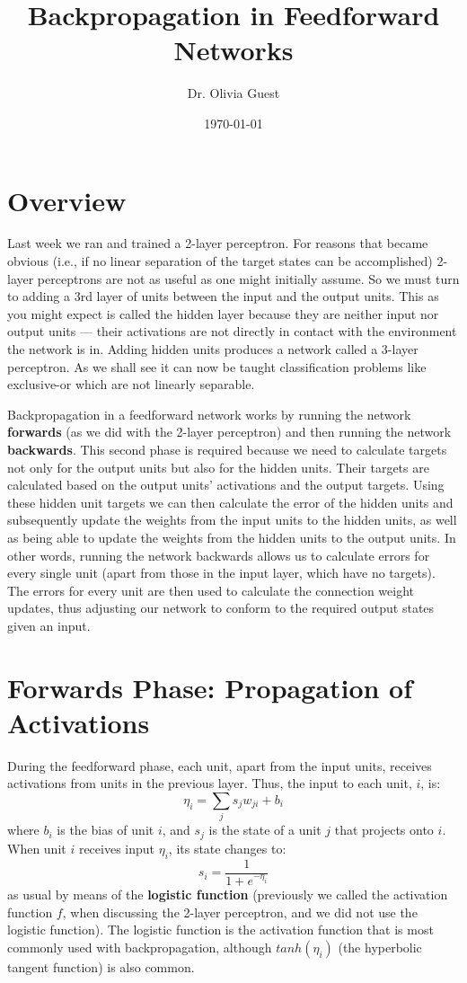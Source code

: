\documentclass[a4paper,10pt]{article}
\title{Backpropagation in Feedforward Networks}
\author{Dr. Olivia Guest}
\date{\today}
\begin{document}
\maketitle
\section{Overview}
Last week we ran and trained a 2-layer perceptron. For reasons that became obvious (i.e., if no linear separation of the target states can be accomplished) 2-layer perceptrons are not as useful as one might initially assume. So we must turn to adding a 3rd layer of units between the input and the output units. This as you might expect is called the hidden layer because they are neither input nor output units --- their activations are not directly in contact with the environment the network is in. Adding hidden units produces a network called a 3-layer perceptron. As we shall see it can now be taught classification problems like exclusive-or which are not linearly separable.

Backpropagation in a feedforward network works by running the network \textbf{forwards} (as we did with the 2-layer perceptron) and then running the network \textbf{backwards}. This second phase is required because we need to calculate targets not only for the output units but also for the hidden units. Their targets are calculated based on the output units' activations and the output targets. Using these hidden unit targets we can then calculate the error of the hidden units and subsequently update the weights from the input units to the hidden units, as well as being able to update the weights from the hidden units to the output units. In other words, running the network backwards allows us to calculate errors for every single unit (apart from those in the input layer, which have no targets).  The errors for every unit are then used to calculate the connection weight updates, thus adjusting our network to conform to the required output states given an input.


\section{Forwards Phase: Propagation of Activations}
During the feedforward phase, each unit, apart from the input units, receives activations from units in the previous layer. Thus, the input to each unit, $i$, is:
\begin{equation}
\label{eq:ff_eta}
 \eta_{i}= \sum_{j} s_jw_{ji} + b_i
\end{equation}
where $b_i$ is the bias of unit $i$, and $s_j$ is the state of a unit $j$ that projects onto $i$.
When unit $i$ receives input $\eta_{i}$, its state changes to:
\begin{equation}
\label{eq:logistic}
  s_i = \frac{1}{1 + e^{-\eta_{i}}}
\end{equation}
as usual by means of the \textbf{logistic function} (previously we called the activation function $f$, when discussing the 2-layer perceptron, and we did not use the logistic function). The logistic function is the activation function that is most commonly used with backpropagation, although $tanh(\eta_i)$ (the hyperbolic tangent function) is also common. 
\end{document}
